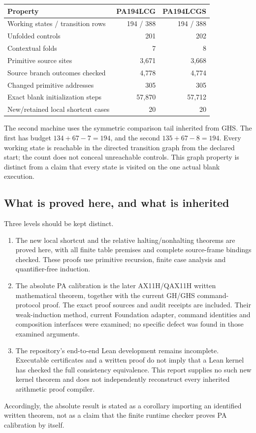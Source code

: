 \documentclass[11pt,letterpaper]{article}
\begin{document}
\begin{center}
\begin{tabular}{lrr}
\toprule
Property & PA194LCG & PA194LCGS\\
\midrule
Working states / transition rows & 194 / 388 & 194 / 388\\
Unfolded controls & 201 & 202\\
Contextual folds & 7 & 8\\
Primitive source sites & 3,671 & 3,668\\
Source branch outcomes checked & 4,778 & 4,774\\
Changed primitive addresses & 305 & 305\\
Exact blank initialization steps & 57,870 & 57,712\\
New/retained local shortcut cases & 20 & 20\\
\bottomrule
\end{tabular}
\end{center}
The second machine uses the symmetric comparison tail inherited from GHS.
The first has budget $134+67-7=194$, and the second
$135+67-8=194$. Every working state is reachable in the directed transition
graph from the declared start; the count does not conceal unreachable
controls. This graph property is distinct from a claim that every state
is visited on the one actual blank execution.

\subsection{What is proved here, and what is inherited}
Three levels should be kept distinct.
\begin{enumerate}
\item The new local shortcut and the relative halting/nonhalting theorems
are proved here, with all finite table premises and complete source-frame
bindings checked. These proofs use primitive recursion, finite case
analysis and quantifier-free induction.
\item The absolute PA calibration is the later AX11H/QAX11H written
mathematical theorem, together with the current GH/GHS command-protocol
proof. The exact proof sources and audit receipts are included. Their
weak-induction method, current Foundation adapter, command identities and
composition interfaces were examined; no specific defect was found in
those examined arguments.
\item The repository's end-to-end Lean development remains incomplete.
Executable certificates and a written proof do not imply that a Lean kernel
has checked the full consistency equivalence. This report supplies no such
new kernel theorem and does not independently reconstruct every inherited
arithmetic proof compiler.
\end{enumerate}
Accordingly, the absolute result is stated as a corollary importing an
identified written theorem, not as a claim that the finite runtime checker
proves PA calibration by itself.
\end{document}
